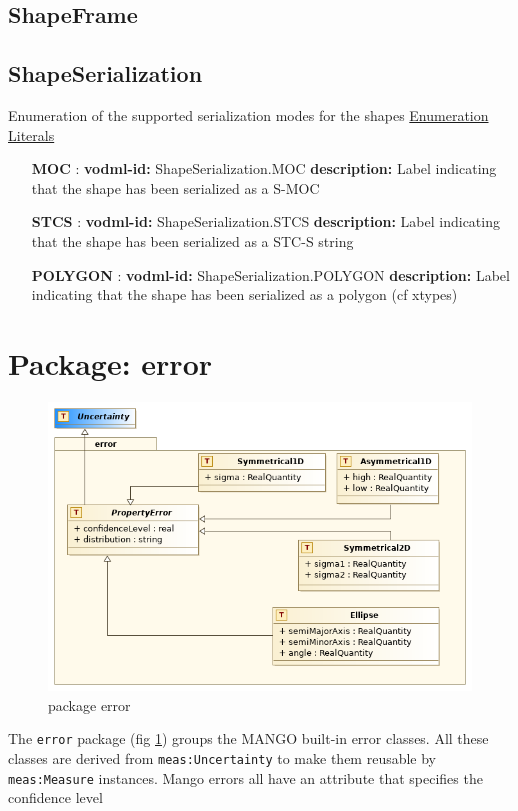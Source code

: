   \subsection{ShapeFrame}

  \subsection{ShapeSerialization}
    \label{sect:ShapeSerialization}
    Enumeration of the supported serialization modes for the shapes
    \noindent \underline{Enumeration Literals}
    \vspace{-\parsep}
    \small
    \begin{itemize}
    \item[\textbf{MOC}]: \textbf{vodml-id:} ShapeSerialization.MOC \newline
    \textbf{description:} Label indicating that the shape has been serialized as a S-MOC
    \item[\textbf{STCS}]: \textbf{vodml-id:} ShapeSerialization.STCS \newline
    \textbf{description:} Label indicating that the shape has been serialized as a STC-S \citep{2007ivoa.spec.1030R} string
    \item[\textbf{POLYGON}]: \textbf{vodml-id:} ShapeSerialization.POLYGON \newline
    \textbf{description:} Label indicating that the shape has been serialized as a polygon (cf xtypes)
    \end{itemize}
    \normalsize

\section{Package: error}
    \begin{figure}[h]
    \includegraphics[width=1.0\textwidth]{../model/error.png}
    \caption{package error}
    \label{fig:error}
    \end{figure}
    The \texttt{error} package (fig \ref{fig:error}) groups the MANGO built-in error classes. All these classes are derived from \texttt{meas:Uncertainty} to make them reusable by \texttt{meas:Measure} instances. Mango errors all have an attribute that specifies the confidence level

